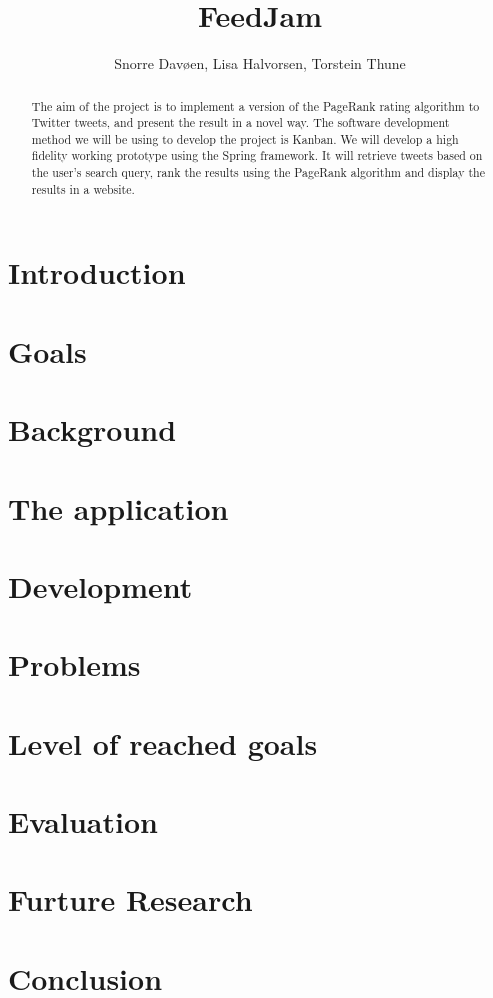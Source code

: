 \documentclass[a4paper,pt12]{article}
\begin{document}
\title{FeedJam}

\author{Snorre Davøen, Lisa Halvorsen, Torstein Thune}
 
\maketitle
\begin{abstract}
The aim of the project is to implement a version of the PageRank rating algorithm to Twitter tweets, and present the result in a novel way. The software development method we will be using to develop the project is Kanban. We will develop a high fidelity working prototype using the Spring framework. It will retrieve tweets based on the user’s search query, rank the results using the PageRank algorithm and display the results in a website.     

\end{abstract}
\newpage

\tableofcontents
\newpage

\section{Introduction}



\section{Goals}


\section{Background}


\section{The application}


\section{Development}


\section{Problems}


\section{Level of reached goals}


\section{Evaluation}


\section{Furture Research}


\section{Conclusion}



%
%
\end{document}
